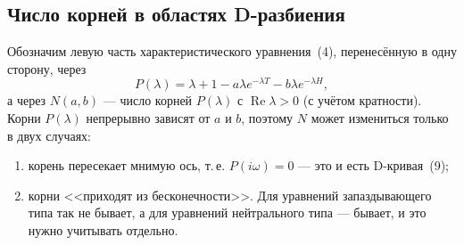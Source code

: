 
\subsection*{Число корней в областях D-разбиения}

Обозначим левую часть характеристического уравнения~(4), перенесённую в одну сторону, через
\[
    P(\lambda) = \lambda + 1 - a\lambda e^{-\lambda T} - b\lambda e^{-\lambda H},
\]
а через $N(a, b)$ --- число корней $P(\lambda)$ с $\operatorname{Re}\lambda > 0$ (с учётом кратности).
Корни $P(\lambda)$ непрерывно зависят от $a$ и $b$, поэтому $N$ может измениться только в двух случаях:
\begin{enumerate}
    \item корень пересекает мнимую ось, т.\,е. $P(i\omega) = 0$ --- это и есть D-кривая~(9);
    \item корни <<приходят из бесконечности>>. Для уравнений запаздывающего типа так не бывает,
    а для уравнений нейтрального типа --- бывает, и это нужно учитывать отдельно.
\end{enumerate}

